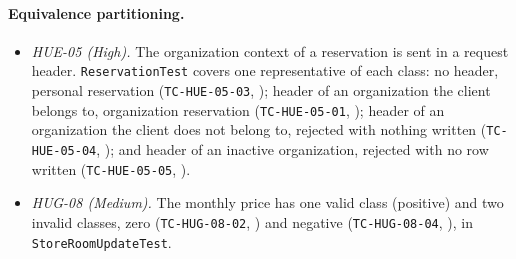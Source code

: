 \paragraph{Equivalence partitioning.}
\begin{itemize}
  \item \emph{HUE-05 (High).} The organization context of a reservation is sent in a request
        header. \texttt{ReservationTest} covers one representative of each class: no header,
        personal reservation (\texttt{TC-HUE-05-03},
        );
        header of an organization the client belongs to, organization reservation
        (\texttt{TC-HUE-05-01},
        );
        header of an organization the client does not belong to, rejected with nothing written
        (\texttt{TC-HUE-05-04},
        ); and header of
        an inactive organization, rejected with no row written (\texttt{TC-HUE-05-05},
        ).
  \item \emph{HUG-08 (Medium).} The monthly price has one valid class (positive) and two invalid
        classes, zero (\texttt{TC-HUG-08-02},
        ) and negative
        (\texttt{TC-HUG-08-04}, ), in
        \texttt{StoreRoomUpdateTest}.
\end{itemize}

